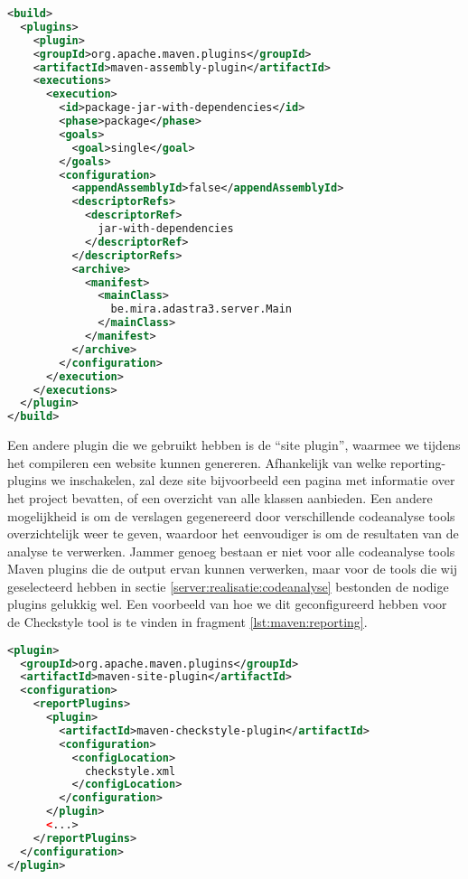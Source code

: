 \begin{lstlisting}[language=XML, float, caption=Gebruik van Maven modules om een executable te compileren., label=lst:fatjar]
<build>
  <plugins>
    <plugin>
    <groupId>org.apache.maven.plugins</groupId>
    <artifactId>maven-assembly-plugin</artifactId>
    <executions>
      <execution>
        <id>package-jar-with-dependencies</id>
        <phase>package</phase>
        <goals>
          <goal>single</goal>
        </goals>
        <configuration>
          <appendAssemblyId>false</appendAssemblyId>
          <descriptorRefs>
            <descriptorRef>
              jar-with-dependencies
            </descriptorRef>
          </descriptorRefs>
          <archive>
            <manifest>
              <mainClass>
                be.mira.adastra3.server.Main
              </mainClass>
            </manifest>
          </archive>
        </configuration>
      </execution>
    </executions>
  </plugin>
</build>
\end{lstlisting}

Een andere plugin die we gebruikt hebben is de ``site plugin'', waarmee we tijdens het compileren een website kunnen genereren. Afhankelijk van welke reporting-plugins we inschakelen, zal deze site bijvoorbeeld een pagina met informatie over het project bevatten, of een overzicht van alle klassen aanbieden. Een andere mogelijkheid is om de verslagen gegenereerd door verschillende codeanalyse tools overzichtelijk weer te geven, waardoor het eenvoudiger is om de resultaten van de analyse te verwerken. Jammer genoeg bestaan er niet voor alle codeanalyse tools Maven plugins die de output ervan kunnen verwerken, maar voor de tools die wij geselecteerd hebben in sectie \ref{server:realisatie:codeanalyse} bestonden de nodige plugins gelukkig wel. Een voorbeeld van hoe we dit geconfigureerd hebben voor de Checkstyle tool is te vinden in fragment \ref{lst:maven:reporting}.

\begin{lstlisting}[language=XML, float, caption=Configuratie van de Maven site plugin voor het genereren van Checkstyle reports., label=lst:maven:reporting]
<plugin>
  <groupId>org.apache.maven.plugins</groupId>
  <artifactId>maven-site-plugin</artifactId>
  <configuration>
    <reportPlugins>
      <plugin>
        <artifactId>maven-checkstyle-plugin</artifactId>
        <configuration>
          <configLocation>
            checkstyle.xml
      	  </configLocation>
        </configuration>
      </plugin>
      <...>
    </reportPlugins>
  </configuration>
</plugin>
\end{lstlisting}

